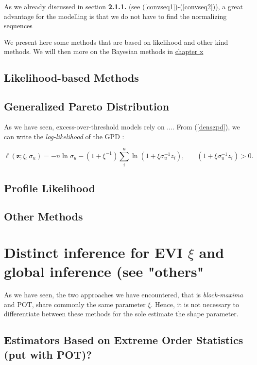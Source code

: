 \documentclass[11pt,a4paper,openany ]{book}
\begin{document}
As we already discussed in section \textbf{2.1.1.} (see (\ref{convseq1})-(\ref{convseq2})), a great advantage for the modelling is that we do not have to find the normalizing sequences
\fi

We present here some methods that are based on likelihood and other kind methods. We will then more on the Bayesian methods in \hyperref[sec:bayesian]{chapter x }
\subsection{Likelihood-based Methods}\label{likintro}



\subsection*{Generalized Pareto Distribution}

As we have seen, excess-over-threshold models rely on ....
From (\ref{densgpd}), we can write the \emph{log-likelihood }of the GPD : 

\begin{equation}\label{likk}
\ell(\textbf{z};\xi,\sigma_u) = -n\ln\sigma_u-(1+\xi^{-1})\sum_{i}^n\ln(1+\xi \sigma_u^{-1}z_i), \ \ \ \ \ \ \ \ (1+\xi \sigma_u^{-1}z_i)>0.
\end{equation}



\subsection{Profile Likelihood}

\subsection{Other Methods}

\section*{Distinct inference for EVI $\xi$ and global inference (see "others"}
\citet[pp.140]{beirlant_statistics_2006}


As we have seen, the two approaches we have encountered, that is \emph{block-maxima} and POT, share commonly the same parameter $\xi$. Hence, it is not necessary to differentiate between these methods for the sole estimate the shape parameter. 

\subsection{Estimators Based on Extreme Order Statistics (put with POT)?}
\end{document}
